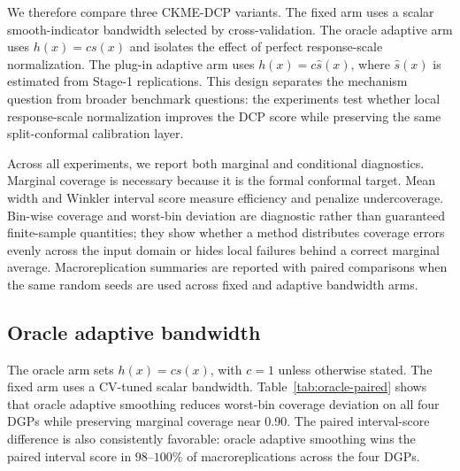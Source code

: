 \documentclass[11pt]{article}
\begin{document}
We therefore compare three CKME-DCP variants. The fixed arm uses a scalar smooth-indicator bandwidth selected by cross-validation. The oracle adaptive arm uses \(h(x)=c s(x)\) and isolates the effect of perfect response-scale normalization. The plug-in adaptive arm uses \(h(x)=c\widehat s(x)\), where \(\widehat s(x)\) is estimated from Stage-1 replications. This design separates the mechanism question from broader benchmark questions: the experiments test whether local response-scale normalization improves the DCP score while preserving the same split-conformal calibration layer.

Across all experiments, we report both marginal and conditional diagnostics. Marginal coverage is necessary because it is the formal conformal target. Mean width and Winkler interval score measure efficiency and penalize undercoverage. Bin-wise coverage and worst-bin deviation are diagnostic rather than guaranteed finite-sample quantities; they show whether a method distributes coverage errors evenly across the input domain or hides local failures behind a correct marginal average. Macroreplication summaries are reported with paired comparisons when the same random seeds are used across fixed and adaptive bandwidth arms.

\subsection{Oracle adaptive bandwidth}

The oracle arm sets \(h(x)=c s(x)\), with \(c=1\) unless otherwise stated. The fixed arm uses a CV-tuned scalar bandwidth. Table~\ref{tab:oracle-paired} shows that oracle adaptive smoothing reduces worst-bin coverage deviation on all four DGPs while preserving marginal coverage near 0.90. The paired interval-score difference is also consistently favorable: oracle adaptive smoothing wins the paired interval score in \(98\)--\(100\%\) of macroreplications across the four DGPs.

\begin{table}[t]
\centering
\caption{Oracle adaptive bandwidth versus fixed bandwidth. The table is generated from the current adaptive-bandwidth experiment. \(\Delta\) is oracle minus fixed, so negative worst-bin deviation is better.}
\label{tab:oracle-paired}

\end{table}
\end{document}
